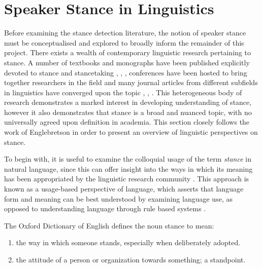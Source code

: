 \documentclass[Dissertation.tex]{subfiles}
\begin{document}
\section{Speaker Stance in Linguistics}\label{sec:speakerStanceLing}
Before examining the stance detection literature, the notion of speaker stance must be conceptualised and explored to broadly inform the remainder of this project. There exists a wealth of contemporary linguistic research pertaining to stance. A number of textbooks and monographs have been published explicitly devoted to stance and stancetaking
\cite{hunstonEvaluationTextAuthorial2000}, \cite{englebretsonStancetakingDiscourseSubjectivity2007}, \cite{karkkainenEpistemicStanceEnglish2003}, 
%
conferences have been hosted to bring together researchers in the field
%
%
and  many journal articles from different subfields in linguistics have converged upon the topic \cite{biberStylesStanceEnglish1989}, \cite{wangCorpusbasedStudyStancetaking2018}, \cite{myersImpersonalYouStancetaking2012}. This heterogeneous body of research demonstrates a marked interest in developing understanding of stance, however it also demonstrates that stance is a broad and nuanced topic, with no universally agreed upon definition in academia. This section closely follows the work of Englebretson \cite{englebretsonStancetakingDiscourseSubjectivity2007} in order to present an overview of linguistic perspectives on stance.

To begin with, it is useful to examine the colloquial usage of the term \textit{stance} in natural language, since this can offer insight into the ways in which its meaning has been appropriated by the linguistic research community \cite{englebretsonStancetakingDiscourseSubjectivity2007}. This approach is known as a usage-based perspective of language, which asserts that language form and meaning can be best understood by examining language use, as opposed to understanding language through rule based systems \cite{barlowUsagebasedModelsLanguage2000}. 

The Oxford Dictionary of English  \cite{StanceOxfordReference} defines the noun stance to mean:

\begin{displayquote}
	\begin{enumerate}
		\item the way in which someone stands, especially when deliberately adopted.
		\item the attitude of a person or organization towards something; a standpoint.
	\end{enumerate}
\end{displayquote}
\end{document}
